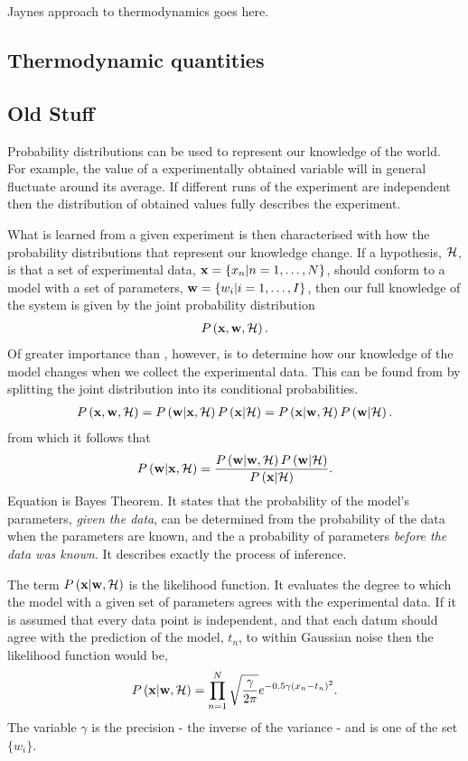 {Jaynes approach to thermodynamics goes here.

\subsection{Thermodynamic quantities}


\subsection{Old Stuff}

Probability distributions can be used to represent our knowledge of the world.
For example, the value of a  experimentally obtained variable will in general
fluctuate around its average.  
If different runs of the experiment are independent
then the  distribution of obtained values fully describes the experiment.

What is learned from a given experiment is then characterised with how the probability distributions
that represent our knowledge change.
If a hypothesis, ${\cal H}$, is that a set of experimental data, $\mathbf{x} = \{x_n|n=1,\ldots,N\}$, should conform to a model with a set of parameters, $\mathbf{w} = \{w_i| i=1,\ldots,I\}$,
then our full knowledge of the system is given by the joint probability distribution
\begin{align}
  P\left( \mathbf{x},\mathbf{w},{\cal H} \right).
  \label{eqn:fullJointDist}
\end{align}
Of greater importance than , however,
is to determine how our knowledge of the model changes when we collect the experimental data.
This can be found from   by splitting the joint distribution into its conditional probabilities.
\begin{align}
  P\left( \mathbf{x},\mathbf{w},{\cal H} \right) = P\left( \mathbf{w}|\mathbf{x},{\cal H} \right)P\left( \mathbf{x}|{\cal H} \right)
  =  P\left( \mathbf{x}|\mathbf{w},{\cal H} \right) P\left( \mathbf{w}|{\cal H} \right).
\end{align}
from which it follows that 
\begin{align}
   P\left( \mathbf{w}|\mathbf{x},{\cal H} \right) =  \frac{P\left( \mathbf{w}|\mathbf{w},{\cal H} \right) P\left( \mathbf{w}|{\cal H} \right)}{P\left( \mathbf{x}|{\cal H} \right)}.
  \label{eqn:BayesTheorem}
\end{align}
Equation  is Bayes Theorem.
It states that the probability of the model's parameters, {\em given the data},
can be determined from the probability of the data when the parameters are known, and the a  probability of parameters {\em before the data was known}.
It describes exactly the process of inference.

The term $P\left( \mathbf{x}|\mathbf{w},{\cal H} \right)$ is the likelihood function.
It evaluates the degree to which the model with a given set of parameters agrees with the experimental data.
If it is assumed that every data point is independent, and that each datum should agree with the prediction of the model, $t_n$, 
to within Gaussian noise
then the likelihood function would be,
\begin{align}
  P\left( \mathbf{x}|\mathbf{w},{\cal H} \right) = \prod_{n=1}^N \sqrt{\frac{\gamma}{2\pi}}e^{-0.5\gamma\left( x_n-t_n \right)^2}.
\end{align}
The variable $\gamma$ is the precision - the inverse of the variance - and is one of the set $\{w_i\}$.

}
